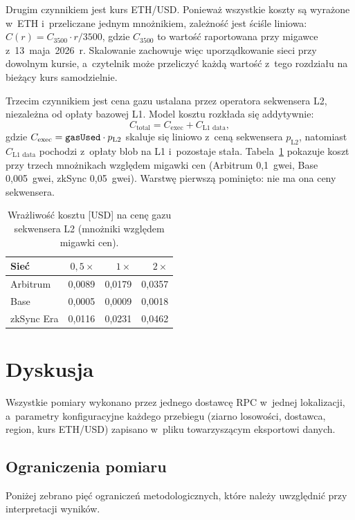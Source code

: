 Drugim czynnikiem jest kurs ETH/USD. Ponieważ wszystkie koszty są wyrażone
w~ETH i~przeliczane jednym mnożnikiem, zależność jest ściśle liniowa:
$C(r) = C_{3500}\cdot r/3500$, gdzie $C_{3500}$ to wartość raportowana przy
migawce z~13~maja~2026~r. Skalowanie zachowuje więc uporządkowanie sieci przy
dowolnym kursie, a~czytelnik może przeliczyć każdą wartość z~tego rozdziału na
bieżący kurs samodzielnie.

Trzecim czynnikiem jest cena gazu ustalana przez operatora sekwensera L2,
niezależna od opłaty bazowej L1. Model kosztu rozkłada się addytywnie:
\[
  C_{\text{total}} = C_{\text{exec}} + C_{\text{L1 data}},
\]
gdzie $C_{\text{exec}} = \texttt{gasUsed}\cdot p_{\text{L2}}$ skaluje się liniowo
z~ceną sekwensera $p_{\text{L2}}$, natomiast $C_{\text{L1 data}}$ pochodzi z~opłaty
blob na L1 i~pozostaje stała. Tabela~\ref{tab:l2price-sens} pokazuje koszt
 przy trzech mnożnikach względem migawki cen (Arbitrum
0{,}1~gwei, Base 0{,}005~gwei, zkSync 0{,}05~gwei). Warstwę pierwszą pominięto:
nie ma ona ceny sekwensera.

\begin{table}[H]
  \centering
  \caption{Wrażliwość kosztu  [USD] na cenę gazu
  sekwensera L2 (mnożniki względem migawki cen).}
  \label{tab:l2price-sens}
  \begin{tabular}{lrrr}
  \toprule
  Sieć & $0{,}5\times$ & $1\times$ & $2\times$ \\
  \midrule
  Arbitrum   & 0{,}0089 & 0{,}0179 & 0{,}0357 \\
  Base       & 0{,}0005 & 0{,}0009 & 0{,}0018 \\
  zkSync Era & 0{,}0116 & 0{,}0231 & 0{,}0462 \\
  \bottomrule
  \end{tabular}
\end{table}

\section{Dyskusja}
\label{sec:l2-dyskusja}

Wszystkie pomiary wykonano przez jednego dostawcę RPC w~jednej lokalizacji,
a~parametry konfiguracyjne każdego przebiegu (ziarno losowości, dostawca, region,
kurs ETH/USD) zapisano w~pliku  towarzyszącym eksportowi danych.

\subsection{Ograniczenia pomiaru}
\label{sec:l2-ograniczenia}
Poniżej zebrano pięć ograniczeń metodologicznych, które należy uwzględnić przy
interpretacji wyników.

